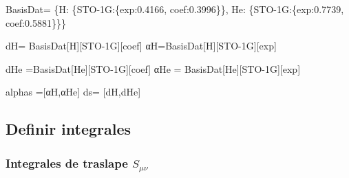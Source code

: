 \documentclass[
  letterpaper,
  DIV=11,
  numbers=noendperiod]{scrreprt}
\newenvironment{Shaded}{\begin{snugshade}}{\end{snugshade}}
\newcommand{\FloatTok}[1]{\textcolor[rgb]{0.68,0.00,0.00}{#1}}
\newcommand{\NormalTok}[1]{\textcolor[rgb]{0.00,0.23,0.31}{#1}}
\newcommand{\OperatorTok}[1]{\textcolor[rgb]{0.37,0.37,0.37}{#1}}
\newcommand{\StringTok}[1]{\textcolor[rgb]{0.13,0.47,0.30}{#1}}
\begin{document}
\begin{Shaded}
\begin{Highlighting}[]
\NormalTok{BasisDat}\OperatorTok{=}\NormalTok{ \{}\StringTok{\textquotesingle{}H\textquotesingle{}}\NormalTok{: \{}\StringTok{\textquotesingle{}STO{-}1G\textquotesingle{}}\NormalTok{:\{}\StringTok{\textquotesingle{}exp\textquotesingle{}}\NormalTok{:}\FloatTok{0.4166}\NormalTok{,}
                           \StringTok{\textquotesingle{}coef\textquotesingle{}}\NormalTok{:}\FloatTok{0.3996}\NormalTok{\}\},               }
          \StringTok{\textquotesingle{}He\textquotesingle{}}\NormalTok{: \{}\StringTok{\textquotesingle{}STO{-}1G\textquotesingle{}}\NormalTok{:\{}\StringTok{\textquotesingle{}exp\textquotesingle{}}\NormalTok{:}\FloatTok{0.7739}\NormalTok{,}
                           \StringTok{\textquotesingle{}coef\textquotesingle{}}\NormalTok{:}\FloatTok{0.5881}\NormalTok{\}\}\}}

\NormalTok{dH}\OperatorTok{=}\NormalTok{ BasisDat[}\StringTok{\textquotesingle{}H\textquotesingle{}}\NormalTok{][}\StringTok{\textquotesingle{}STO{-}1G\textquotesingle{}}\NormalTok{][}\StringTok{\textquotesingle{}coef\textquotesingle{}}\NormalTok{]}
\NormalTok{αH}\OperatorTok{=}\NormalTok{BasisDat[}\StringTok{\textquotesingle{}H\textquotesingle{}}\NormalTok{][}\StringTok{\textquotesingle{}STO{-}1G\textquotesingle{}}\NormalTok{][}\StringTok{\textquotesingle{}exp\textquotesingle{}}\NormalTok{]}

\NormalTok{dHe }\OperatorTok{=}\NormalTok{BasisDat[}\StringTok{\textquotesingle{}He\textquotesingle{}}\NormalTok{][}\StringTok{\textquotesingle{}STO{-}1G\textquotesingle{}}\NormalTok{][}\StringTok{\textquotesingle{}coef\textquotesingle{}}\NormalTok{]}
\NormalTok{αHe }\OperatorTok{=}\NormalTok{ BasisDat[}\StringTok{\textquotesingle{}He\textquotesingle{}}\NormalTok{][}\StringTok{\textquotesingle{}STO{-}1G\textquotesingle{}}\NormalTok{][}\StringTok{\textquotesingle{}exp\textquotesingle{}}\NormalTok{]}

\NormalTok{alphas }\OperatorTok{=}\NormalTok{[αH,αHe]}
\NormalTok{ds}\OperatorTok{=}\NormalTok{ [dH,dHe]}
\end{Highlighting}
\end{Shaded}

\hypertarget{definir-integrales-1}{%
\subsection{Definir integrales}\label{definir-integrales-1}}

\hypertarget{integrales-de-traslape-s_mu-nu-1}{%
\subsubsection{\texorpdfstring{Integrales de traslape
\(S_{\mu \nu}\)}{Integrales de traslape S\_\{\textbackslash mu \textbackslash nu\}}}\label{integrales-de-traslape-s_mu-nu-1}}
\end{document}
